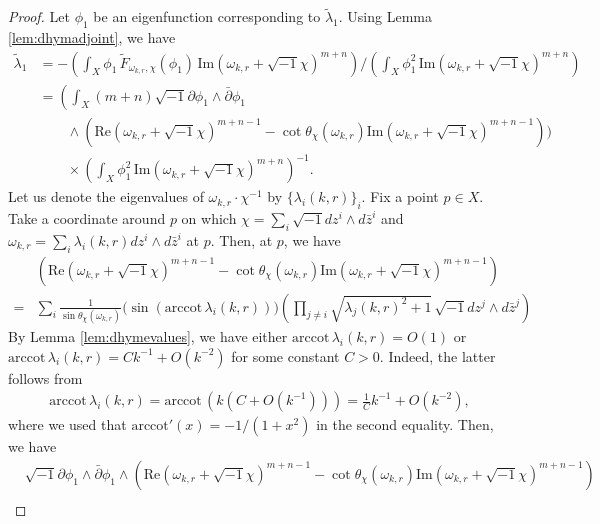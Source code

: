 \documentclass{amsart}
\numberwithin{equation}{section}
\theoremstyle{plain}
\theoremstyle{definition}
\theoremstyle{remark}
\begin{document}
\begin{proof}
    Let $\phi_1$ be an eigenfunction corresponding to $\tilde{\lambda}_1$. Using Lemma \ref{lem:dhymadjoint}, we have
    \begin{align*}
        \tilde{\lambda}_1
        &=-\left(\int_X\phi_1\, \tilde{F}_{\omega_{k,r},\chi}(\phi_1)\, \mathrm{Im}(\omega_{k,r}+\sqrt{-1}\chi)^{m+n}\right)\Big/\left(\int_X\phi_1^2\, \mathrm{Im}(\omega_{k,r}+\sqrt{-1}\chi)^{m+n}\right)\\
        &=\left(\int_X (m+n)\sqrt{-1}\partial\phi_1\wedge \bar{\partial}\phi_1\right.\\
        &\qquad\wedge \left(\mathrm{Re}(\omega_{k,r}+\sqrt{-1}\chi)^{m+n-1}-\cot{\theta_\chi(\omega_{k,r})}\mathrm{Im}(\omega_{k,r}+\sqrt{-1}\chi)^{m+n-1}\right)\bigg)\\
        &\qquad\times\left(\int_X\phi_1^2\, \mathrm{Im}(\omega_{k,r}+\sqrt{-1}\chi)^{m+n}\right)^{-1}.
    \end{align*}
    Let us denote the eigenvalues of $\omega_{k,r}\cdot\chi^{-1}$ by $\{\lambda_i(k,r)\}_i$. Fix a point $p\in X$. Take a coordinate around $p$ on which $\chi=\sum_i\sqrt{-1}dz^i\wedge d\bar{z}^i$ and $\omega_{k,r}=\sum_i \lambda_i(k,r)dz^i\wedge d\bar{z}^i$ at $p$.
    Then, at $p$, we have
    \begin{align*}
        &\left(\mathrm{Re}(\omega_{k,r}+\sqrt{-1}\chi)^{m+n-1}-\cot{\theta_\chi(\omega_{k,r})}\mathrm{Im}(\omega_{k,r}+\sqrt{-1}\chi)^{m+n-1}\right)\\
        =&\sum_i\frac{1}{\sin\theta_\chi(\omega_{k,r})}\big(\sin(\mathrm{arccot}\,\lambda_i(k,r))\big)\left(\prod_{j\neq i}\sqrt{\lambda_j(k,r)^2+1}\, \sqrt{-1}dz^j\wedge d\bar{z}^j\right)
    \end{align*}
    By Lemma \ref{lem:dhymevalues}, we have either $\mathrm{arccot}\, \lambda_i(k,r)=O(1)$ or $\mathrm{arccot}\, \lambda_i(k,r)=Ck^{-1}+O(k^{-2})$ for some constant $C>0$. Indeed, the latter follows from 
    \begin{align*}
        \mathrm{arccot}\, \lambda_i(k,r)=\mathrm{arccot}\, (k(C+O(k^{-1})))=\frac{1}{C}k^{-1}+O(k^{-2}),
    \end{align*}
    where we used that $\mathrm{arccot}'(x)=-1/(1+x^2)$ in the second equality. Then, we have
    \begin{align*}
        &\sqrt{-1}\partial\phi_1\wedge\bar{\partial}\phi_1\wedge\left(\mathrm{Re}(\omega_{k,r}+\sqrt{-1}\chi)^{m+n-1}-\cot{\theta_\chi(\omega_{k,r})}\mathrm{Im}(\omega_{k,r}+\sqrt{-1}\chi)^{m+n-1}\right)\\

\end{align*}
\end{proof}
\end{document}
